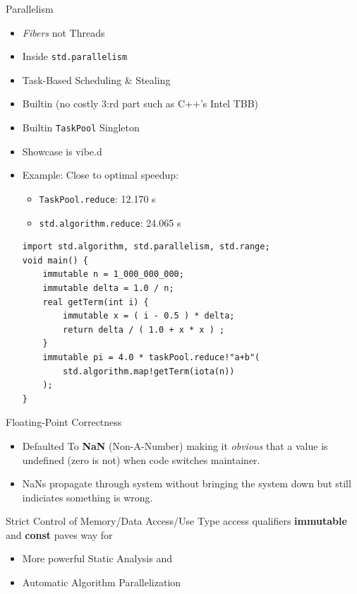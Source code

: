 \documentclass[xcolor=dvipsnames]{beamer}
\begin{document}
\begin{frame}[fragile]{Parallelism}
  \begin{itemize}[<+->]
  \item \emph{Fibers} not Threads
  \item Inside \texttt{std.parallelism}
  \item Task-Based Scheduling \& Stealing
  \item Builtin (no costly 3:rd part such as C++'s Intel TBB)
  \item Builtin \texttt{TaskPool} Singleton
  \item Showcase is vibe.d
  \item Example: Close to optimal speedup:
    \begin{itemize}[<+->]
    \item \texttt{TaskPool.reduce}: 12.170 s
    \item \texttt{std.algorithm.reduce}: 24.065 s
    \end{itemize}
\begin{lstlisting}[frame=single]
import std.algorithm, std.parallelism, std.range;
void main() {
    immutable n = 1_000_000_000;
    immutable delta = 1.0 / n;
    real getTerm(int i) {
        immutable x = ( i - 0.5 ) * delta;
        return delta / ( 1.0 + x * x ) ;
    }
    immutable pi = 4.0 * taskPool.reduce!"a+b"(
        std.algorithm.map!getTerm(iota(n))
    );
}
\end{lstlisting}
  \end{itemize}
\end{frame}

\begin{frame}[fragile]{Floating-Point Correctness}
  \begin{itemize}[<+->]
  \item Defaulted To \textbf{NaN} (Non-A-Number) making it \textit{obvious} that
    a value is undefined (zero is not) when code switches maintainer.
  \item NaNs propagate through system without bringing the system down but still
    indiciates something is wrong.
  \end{itemize}
\end{frame}

\begin{frame}[fragile]{Strict Control of Memory/Data Access/Use}
  Type access qualifiers \textbf{immutable} and \textbf{const} paves way for
  \begin{itemize}[<+->]
  \item More powerful Static Analysis and
  \item Automatic Algorithm Parallelization
  \end{itemize}
\end{frame}
\end{document}
